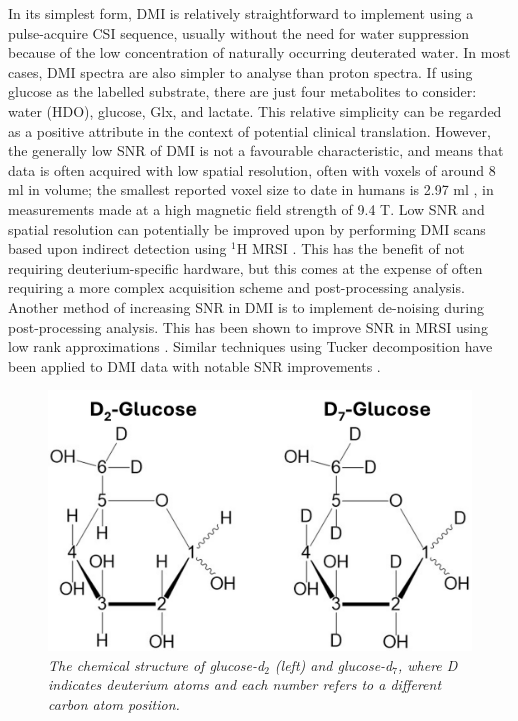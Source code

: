 In its simplest form, \ac{DMI} is relatively straightforward to implement using a pulse-acquire \ac{CSI} sequence, usually without the need for water suppression because of the low concentration of naturally occurring deuterated water. In most cases, \ac{DMI} spectra are also simpler to analyse than proton spectra. If using glucose as the labelled substrate, there are just four metabolites to consider: water (\ac{HDO}), glucose, Glx, and lactate. This relative simplicity can be regarded as a positive attribute in the context of potential clinical translation. However, the generally low \ac{SNR} of \ac{DMI} is not a favourable characteristic, and means that data is often acquired with low spatial resolution, often with voxels of around 8 ml \cite{DeFeyter2021DeuteriumFuture, deGraaf2020OnImaging} in volume; the smallest reported voxel size to date in humans is 2.97 ml \cite{Ruhm2022Dynamic9.4T}, in measurements made at a high magnetic field strength of 9.4 T. Low \ac{SNR} and spatial resolution can potentially be improved upon by performing \ac{DMI} scans based upon indirect detection using $^1$H \ac{MRSI} \cite{vanZijl2020SpectroscopicFluxes, Bednarik2021DeuteriumBrain, Niess2023Reproducibility3T, Ruhm2022Dynamic9.4T}. This has the benefit of not requiring deuterium-specific hardware, but this comes at the expense of often requiring a more complex acquisition scheme and post-processing analysis. Another method of increasing \ac{SNR} in \ac{DMI} is to implement de-noising during post-processing analysis. This has been shown to improve \ac{SNR} in \ac{MRSI} using low rank approximations \cite{Nguyen2013DenoisingApproximations}. Similar techniques using Tucker decomposition \cite{Tucker1966SomeAnalysis, Bader2007EfficientTensors} have been applied to \ac{DMI} data with notable \ac{SNR} improvements \cite{vonMorze2021ComparisonT, Kreis2020MeasuringMRI}.

\begin{figure}
    \centering
    \includegraphics[width = 1\textwidth]{Figures/Glucose/Glucose.png}
    \caption{\textit{The chemical structure of glucose-d$_2$ (left) and glucose-d$_7$, where D indicates deuterium atoms and each number refers to a different carbon atom position.}}
    \label{fig:Glu:Glucose}
\end{figure}

